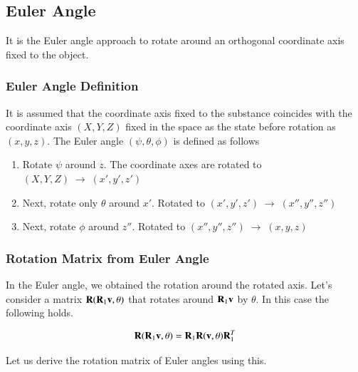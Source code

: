 \subsection{Euler Angle}

It is the Euler angle approach to rotate around an orthogonal coordinate axis fixed to the object.

\subsubsection{Euler Angle Definition}

It is assumed that the coordinate axis fixed to the substance coincides with the coordinate axis $(X,Y,Z)$ fixed in the space as the state before rotation as $(x,y,z)$. The Euler angle $(\psi,\theta,\phi)$ is defined as follows

\begin {enumerate}
\item Rotate $\psi$ around $z$. The coordinate axes are rotated to $(X,Y,Z)\;\rightarrow\;(x',y',z')$
\item Next, rotate only $\theta$ around $x'$. Rotated to $(x',y',z')\;\rightarrow\;(x'',y'',z'')$
\item Next, rotate $\phi$ around $z''$. Rotated to $(x'',y'',z'')\;\rightarrow\;(x,y,z)$
\end {enumerate}

\subsubsection{Rotation Matrix from Euler Angle}

In the Euler angle, we obtained the rotation around the rotated axis. Let's consider a matrix $\mathbf{R}(\mathbf{R}_1\mathbf{v},\theta)$ that rotates around $\mathbf{R}_1\mathbf{v}$ by $\theta$. In this case the following holds.

\begin{equation}
\mathbf{R}(\mathbf{R}_1\mathbf{v},\theta) = \mathbf{R}_1\mathbf{R}(\mathbf{v},\theta)\mathbf{R}_1^T
\end{equation}

Let us derive the rotation matrix of Euler angles using this.


